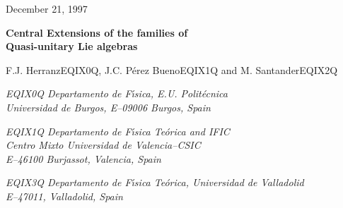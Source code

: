 

\thispagestyle{empty}

\hfill December 21, 1997
\bigskip\bigskip

\begin{center}

{\LARGE{\bf{Central Extensions of the families of
\\[0.3cm]
Quasi-unitary Lie algebras}}}
\end{center}

\bigskip

\begin{center}
F.J. HerranzEQIX0Q,
J.C. P\'erez BuenoEQIX1Q
and M. SantanderEQIX2Q
\end{center}

\begin{center}
{\it EQIX0Q Departamento de F\'{\i}sica, E.U. Polit\'ecnica \\
Universidad de Burgos, E--09006 Burgos, Spain}
\end{center}

\begin{center}
{\it EQIX1Q Departamento de F\'{\i}sica Te\'orica and IFIC \\
Centro Mixto Universidad de Valencia--CSIC \\
E--46100 Burjassot, Valencia, Spain}
\end{center}

\begin{center}
{\it EQIX3Q Departamento de F\'{\i}sica Te\'orica,
Universidad de Valladolid \\
E--47011, Valladolid, Spain}
\end{center}

\begin{abstract}
The most general possible central extensions of two whole families of  Lie
algebras, which can be obtained by contracting the special pseudo-unitary
algebras EQIX4Q of the  Cartan series EQIX5Q and the pseudo-unitary
algebras
EQIX6Q, are completely determined and classified for arbitrary EQIX7Q.
In addition to the EQIX4Q and EQIX6Q algebras, whose second cohomology
group is well known to be trivial, each family includes many non-semisimple
algebras; their central extensions, which are explicitly given, can be
classified into three types as far as their properties under contraction are
involved. A  closed expression for the dimension of the second cohomology group
of any member of these families of algebras is given.
\end{abstract}

